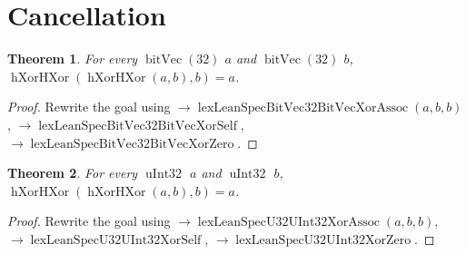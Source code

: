 \documentclass[11pt]{article}
\newtheorem{theorem}{Theorem}[section]
\theoremstyle{definition}
\begin{document}
\section{Cancellation}
\label{ll:cancellation:exclusive}
\begin{theorem}
\label{ll:cancellation:xor-cancel}
For every \(\operatorname{bitVec}(32)\) \(a\) and \(\operatorname{bitVec}(32)\) \(b\), \(\operatorname{hXorHXor}(\operatorname{hXorHXor}(a, b), b) = a\).
\end{theorem}
\begin{proof}
Rewrite the goal using \(\rightarrow \operatorname{lexLeanSpecBitVec32BitVecXorAssoc}(a, b, b)\), \(\rightarrow \operatorname{lexLeanSpecBitVec32BitVecXorSelf}\), \(\rightarrow \operatorname{lexLeanSpecBitVec32BitVecXorZero}\).
\end{proof}
\begin{theorem}
\label{ll:cancellation:xor-cancel-u32}
For every \(\operatorname{uInt32}\) \(a\) and \(\operatorname{uInt32}\) \(b\), \(\operatorname{hXorHXor}(\operatorname{hXorHXor}(a, b), b) = a\).
\end{theorem}
\begin{proof}
Rewrite the goal using \(\rightarrow \operatorname{lexLeanSpecU32UInt32XorAssoc}(a, b, b)\), \(\rightarrow \operatorname{lexLeanSpecU32UInt32XorSelf}\), \(\rightarrow \operatorname{lexLeanSpecU32UInt32XorZero}\).
\end{proof}
\end{document}
